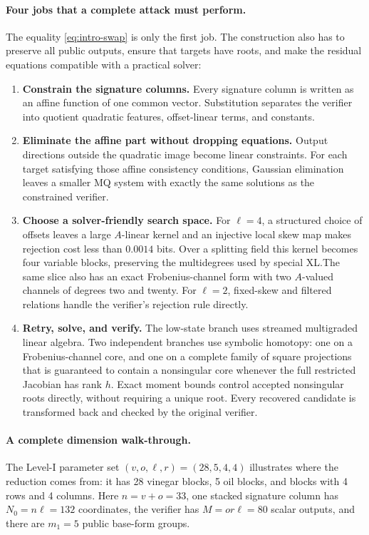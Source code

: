 \documentclass[11pt]{article}
\begin{document}
\paragraph{Four jobs that a complete attack must perform.}
The equality \eqref{eq:intro-swap} is only the first job.  The construction
also has to preserve all public outputs, ensure that targets have roots, and
make the residual equations compatible with a practical solver:
\begin{enumerate}[label=\textbf{\arabic*.},itemsep=3pt]
\item \textbf{Constrain the signature columns.}  Every signature column is
      written as an affine function of one common vector.  Substitution
      separates the verifier into quotient quadratic features, offset-linear
      terms, and constants.
\item \textbf{Eliminate the affine part without dropping equations.}  Output
      directions outside the quadratic image become linear constraints.  For
      each target satisfying those affine consistency conditions, Gaussian
      elimination leaves a smaller MQ system with exactly the same solutions
      as the constrained verifier.
\item \textbf{Choose a solver-friendly search space.}  For $\ell=4$, a
      structured choice of offsets leaves a large $A$-linear kernel and an
      injective local skew map makes rejection cost less than $0.0014$ bits.  Over a
      splitting field this kernel becomes four variable blocks, preserving the
      multidegrees used by special XL.\@  The same slice also has an exact
      Frobenius-channel form with two $A$-valued channels of degrees two and
      twenty.  For $\ell=2$, fixed-skew and filtered relations handle the
      verifier's rejection rule directly.
\item \textbf{Retry, solve, and verify.}  The low-state branch uses streamed
      multigraded linear algebra.  Two independent branches use symbolic
      homotopy: one on a Frobenius-channel core, and one on a complete family of
      square projections that is guaranteed to contain a nonsingular core
      whenever the full restricted Jacobian has rank $h$.  Exact moment bounds
      control accepted nonsingular roots directly, without requiring a unique
      root.  Every recovered candidate is transformed back and checked by the
      original verifier.
\end{enumerate}

\paragraph{A complete dimension walk-through.}
The Level-I parameter set $(v,o,\ell,r)=(28,5,4,4)$ illustrates where the
reduction comes from: it has 28 vinegar blocks, 5 oil blocks, and blocks with
4 rows and 4 columns.  Here $n=v+o=33$, one stacked signature column has
$N_0=n\ell=132$ coordinates, the verifier has $M=or\ell=80$ scalar outputs,
and there are $m_1=5$ public base-form groups.
\end{document}
